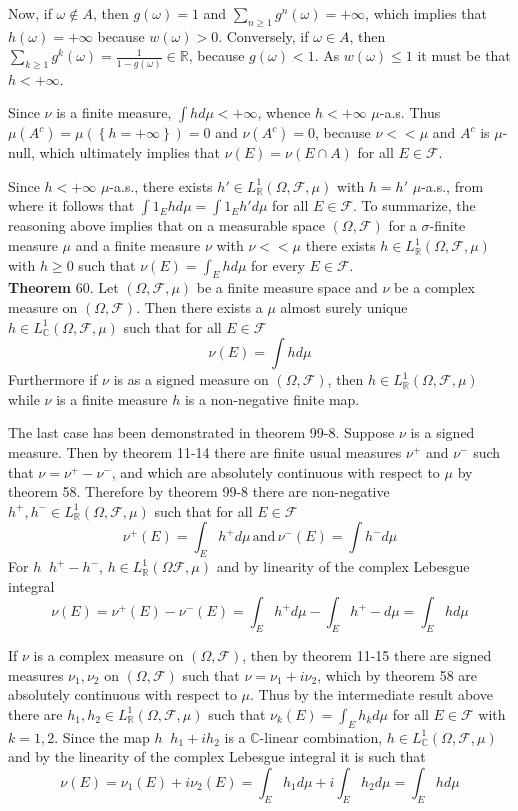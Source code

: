 \documentclass[a4paper]{article}
\newcommand{\obj}[1]{\left\{ #1 \right \}}
\newcommand{\brac}[1]{\left ( #1 \right )}
\newcommand{\Real}{\mathbb{R}}
\newcommand{\Cplx}{\mathbb{C}}
\newcommand{\Fcal}{\mathcal{F}}
\newcommand{\defn}{\mathop{\overset{\Delta}{=}}\nolimits}
\begin{document}
Now, if $\omega\notin A$, then $g\brac{\omega}=1$ and $\sum_{n\geq1}g^n\brac{\omega}=+\infty$, which implies that $h\brac{\omega}=+\infty$ because $w\brac{\omega}>0$. Conversely, if $\omega\in A$, then $\sum_{k\geq 1} g^k\brac{\omega} = \frac{1}{1-g\brac{\omega}}\in \Real$, because $g\brac{\omega}<1$. As $w\brac{\omega}\leq 1$ it must be that $h<+\infty$.

Since $\nu$ is a finite measure, $\int h d\mu<+\infty$, whence $h<+\infty$ $\mu$-a.s. Thus $\mu\brac{A^c}=\mu\brac{\obj{h=+\infty}}=0$ and $\nu\brac{A^c}=0$, because $\nu<<\mu$ and $A^c$ is $\mu$-null, which ultimately implies that $\nu\brac{E}=\nu\brac{E\cap A}$ for all $E\in \Fcal$.

Since $h<+\infty$ $\mu$-a.s., there exists $h'\in L^1_\Real\brac{\Omega, \Fcal, \mu}$ with $h=h'$ $\mu$-a.s., from where it follows that $\int 1_E h d\mu = \int 1_E h' d\mu$ for all $E\in \Fcal$. To summarize, the reasoning above implies that on a measurable space $\brac{\Omega, \Fcal}$ for a $\sigma$-finite measure $\mu$ and a finite measure $\nu$ with $\nu<<\mu$ there exists $h\in L^1_\Real\brac{\Omega, \Fcal, \mu}$ with $h\geq 0$ such that $\nu\brac{E} = \int_E h d\mu$ for every $E\in \Fcal$.\\

\label{thm:radon_nikodym_complex_meas} \noindent \textbf{Theorem} 60.
Let $\brac{\Omega, \Fcal, \mu}$ be a finite measure space and $\nu$ be a complex measure on $\brac{\Omega, \Fcal}$. Then there exists a $\mu$ almost surely unique $h\in L^1_\Cplx\brac{\Omega, \Fcal, \mu}$ such that for all $E\in \Fcal$ \[\nu\brac{E} = \int h d\mu\] Furthermore if $\nu$ is as a signed measure on $\brac{\Omega, \Fcal}$, then $h\in L^1_\Real\brac{\Omega, \Fcal, \mu}$ while $\nu$ is a finite measure $h$ is a non-negative finite map.

The last case has been demonstrated in theorem 99-8. Suppose $\nu$ is a signed measure. Then by theorem 11-14 there are finite usual measures $\nu^+$ and $\nu^-$ such that $\nu=\nu^+-\nu^-$, and which are absolutely continuous with respect to $\mu$ by theorem 58. Therefore by theorem 99-8 there are non-negative $h^+, h^-\in L^1_\Real\brac{\Omega, \Fcal, \mu}$ such that for all $E\in \Fcal$ \[\nu^+\brac{E} = \int_E h^+ d\mu\,\text{and}\,\nu^-\brac{E} = \int h^- d\mu\] For $h\defn h^+-h^-$, $h\in L^1_\Real\brac{\Omega \Fcal, \mu}$ and by linearity of the complex Lebesgue integral \[\nu\brac{E} = \nu^+\brac{E} - \nu^-\brac{E} = \int_E h^+ d\mu - \int_E h^+- d\mu = \int_E h d\mu\] 

If $\nu$ is a complex measure on $\brac{\Omega, \Fcal}$, then by theorem 11-15 there are signed measures $\nu_1,\nu_2$ on $\brac{\Omega, \Fcal}$ such that $\nu = \nu_1 + i \nu_2$, which by theorem 58 are absolutely continuous with respect to $\mu$. Thus by the intermediate result above there are $h_1, h_2\in L^1_\Real\brac{\Omega, \Fcal, \mu}$ such that $\nu_k\brac{E} = \int_E h_k d\mu$ for all $E\in \Fcal$ with $k=1,2$. Since the map $h\defn h_1 + i h_2$ is a $\Cplx$-linear combination, $h\in L^1_\Cplx\brac{\Omega, \Fcal, \mu}$ and by the linearity of the complex Lebesgue integral it is such that \[\nu\brac{E} = \nu_1\brac{E}+i \nu_2\brac{E} = \int_E h_1 d\mu + i \int_E h_2 d\mu = \int_E h d\mu\]
\end{document}
